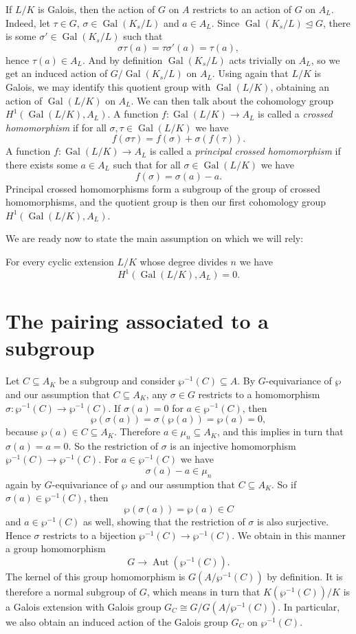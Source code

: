\documentclass[12pt]{amsart}
\DeclareMathOperator{\Gal}{Gal}
\DeclareMathOperator{\Aut}{Aut}
\begin{document}
If $L/K$ is Galois, then the action of $G$ on $A$ restricts to an action of $G$ on $A_{L}$.
Indeed, let $\tau\in G$, $\sigma\in \Gal(K_{s}/L)$ and $a\in A_{L}$.
Since $\Gal(K_{s}/L)\trianglelefteq G$, there is some $\sigma'\in \Gal(K_{s}/L)$ such that
\[ \sigma\tau(a)=\tau\sigma'(a)=\tau(a), \]
hence $\tau(a)\in A_{L}$.
And by definition $\Gal(K_{s}/L)$ acts trivially on $A_{L}$, so we get an induced action of $G/\Gal(K_{s}/L)$ on $A_{L}$.
Using again that $L/K$ is Galois, we may identify this quotient group with $\Gal(L/K)$, obtaining an action of $\Gal(L/K)$ on $A_{L}$.
We can then talk about the cohomology group $H^{1}(\Gal(L/K),A_{L})$.
A function $f\colon \Gal(L/K)\to A_{L}$ is called a \textit{crossed homomorphism} if for all $\sigma,\tau\in \Gal(L/K)$ we have
\[ f(\sigma\tau)=f(\sigma)+\sigma (f(\tau)). \]
A function $f\colon \Gal(L/K)\to A_{L}$ is called a \textit{principal crossed homomorphism} if there exists some $a\in A_{L}$ such that for all $\sigma \in \Gal(L/K)$ we have
\[ f(\sigma)=\sigma(a)-a. \]
Principal crossed homomorphisms form a subgroup of the group of crossed homomorphisms, and the quotient group is then our first cohomology group $H^{1}(\Gal(L/K),A_{L})$.

We are ready now to state the main assumption on which we will rely:

\begin{axiom}
    For every cyclic extension $L/K$ whose degree divides $n$ we have
    \[ H^{1}(\Gal(L/K),A_{L})=0. \]
\end{axiom}

\section{The pairing associated to a subgroup}

Let $C\subseteq A_{K}$ be a subgroup and consider $\wp^{-1}(C)\subseteq A$.
By $G$-equivariance of $\wp$ and our assumption that $C\subseteq A_{K}$, any $\sigma\in G$ restricts to a homomorphism $\sigma\colon \wp^{-1}(C)\to \wp^{-1}(C)$.
If $\sigma(a)=0$ for $a\in \wp^{-1}(C)$, then
\[ \wp(\sigma(a))=\sigma(\wp(a))=\wp(a)=0, \]
because $\wp(a)\in C\subseteq A_{K}$.
Therefore $a\in \mu_{n}\subseteq A_{K}$, and this implies in turn that $\sigma(a)=a=0$.
So the restriction of $\sigma$ is an injective homomorphism $\wp^{-1}(C)\to \wp^{-1}(C)$.
For $a\in \wp^{-1}(C)$ we have
\[ \sigma(a)-a\in \mu_{n} \]
again by $G$-equivariance of $\wp$ and our assumption that $C\subseteq A_{K}$.
So if $\sigma(a)\in \wp^{-1}(C)$, then
\[ \wp(\sigma(a))=\wp(a)\in C \]
and $a\in \wp^{-1}(C)$ as well, showing that the restriction of $\sigma$ is also surjective.
Hence $\sigma$ restricts to a bijection $\wp^{-1}(C)\to \wp^{-1}(C)$.
We obtain in this manner a group homomorphism
\[ G\to \Aut(\wp^{-1}(C)). \]
The kernel of this group homomorphism is $G(A/\wp^{-1}(C))$ by definition.
It is therefore a normal subgroup of $G$, which means in turn that $K(\wp^{-1}(C))/K$ is a Galois extension with Galois group $G_{C}\cong G/G(A/\wp^{-1}(C))$.
In particular, we also obtain an induced action of the Galois group $G_{C}$ on $\wp^{-1}(C)$.
\end{document}
